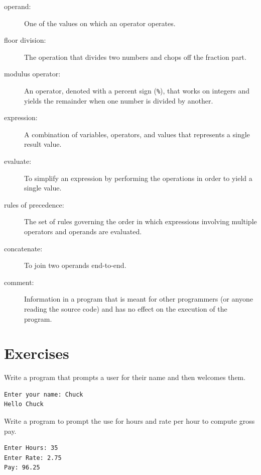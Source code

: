\documentclass[10pt]{book}
\begin{document}
\begin{description}
\item[operand:]  One of the values on which an operator operates.

\item[floor division:] The operation that divides two numbers and chops off
the fraction part.

\item[modulus operator:]  An operator, denoted with a percent sign
({\tt \%}), that works on integers and yields the remainder when one
number is divided by another.

\item[expression:]  A combination of variables, operators, and values that
represents a single result value.

\item[evaluate:]  To simplify an expression by performing the operations
in order to yield a single value.

\item[rules of precedence:]  The set of rules governing the order in which
expressions involving multiple operators and operands are evaluated.

\item[concatenate:]  To join two operands end-to-end.

\item[comment:]  Information in a program that is meant for other
programmers (or anyone reading the source code) and has no effect on the
execution of the program.

\end{description}

\section{Exercises}

\begin{ex}
Write a program that prompts a user for their name and then 
welcomes them.

\begin{verbatim}
Enter your name: Chuck
Hello Chuck
\end{verbatim}

\end{ex}

\begin{ex}
Write a program to prompt the use for hours and rate per hour to compute
gross pay.
\begin{verbatim}
Enter Hours: 35
Enter Rate: 2.75
Pay: 96.25
\end{verbatim}
\end{ex}
\end{document}
